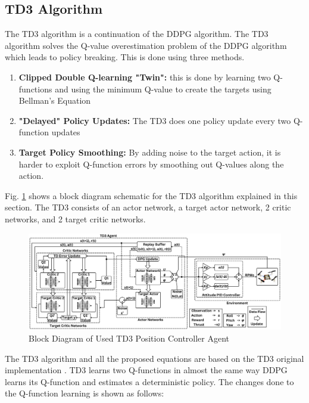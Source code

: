     \subsection{TD3 Algorithm}
    The TD3 algorithm is a continuation of the DDPG algorithm. The TD3 algorithm solves the Q-value overestimation problem of the DDPG algorithm which leads to policy breaking. This is done using three methods.
    \begin{enumerate}
        \item \textbf{Clipped Double Q-learning "Twin":} this is done by learning two Q-functions and using the minimum Q-value to create the targets using Bellman's Equation
        \item \textbf{"Delayed" Policy Updates:} The TD3 does one policy update every two Q-function updates
        \item \textbf{Target Policy Smoothing:} By adding noise to the target action, it is harder to exploit Q-function errors by smoothing out Q-values along the action.
    \end{enumerate}
    Fig. \ref{TD3 Block Diagram} shows a block diagram schematic for the TD3 algorithm explained in this section. The TD3 consists of an actor network, a target actor network, 2 critic networks, and 2 target critic networks.
    \begin{figure}[H]
            \centering
            \includegraphics[width=1\linewidth]{Images/TD3.png}
            \caption{Block Diagram of Used TD3 Position Controller Agent}
            \label{TD3 Block Diagram}
    \end{figure}
    The TD3 algorithm and all the proposed equations are based on the TD3 original implementation \cite{fujimoto2018addressing}. TD3 learns two Q-functions in almost the same way DDPG learns its Q-function and estimates a deterministic policy. 
    \clearpage
    The changes done to the Q-function learning is shown as follows:
